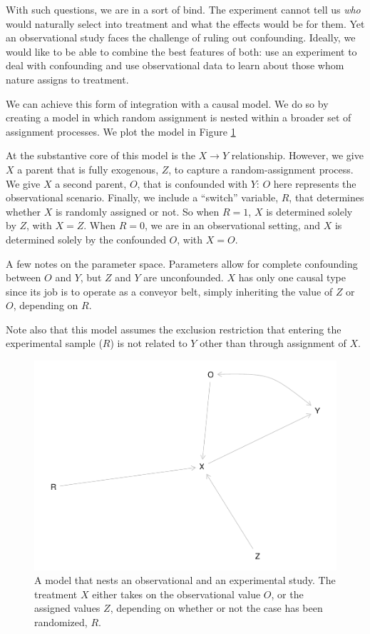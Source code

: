 \documentclass[
  12pt,
]{book}
\begin{document}
With such questions, we are in a sort of bind. The experiment cannot tell us \emph{who} would naturally select into treatment and what the effects would be for them. Yet an observational study faces the challenge of ruling out confounding. Ideally, we would like to be able to combine the best features of both: use an experiment to deal with confounding and use observational data to learn about those whom nature assigns to treatment.

We can achieve this form of integration with a causal model. We do so by creating a model in which random assignment is nested within a broader set of assignment processes. We plot the model in Figure \ref{fig:appcombexpob}

At the substantive core of this model is the \(X \rightarrow Y\) relationship. However, we give \(X\) a parent that is fully exogenous, \(Z\), to capture a random-assignment process. We give \(X\) a second parent, \(O\), that is confounded with \(Y\): \(O\) here represents the observational scenario. Finally, we include a ``switch'' variable, \(R\), that determines whether \(X\) is randomly assigned or not. So when \(R=1\), \(X\) is determined solely by \(Z\), with \(X=Z\). When \(R=0\), we are in an observational setting, and \(X\) is determined solely by the confounded \(O\), with \(X=O\).

A few notes on the parameter space. Parameters allow for complete confounding between \(O\) and \(Y\), but \(Z\) and \(Y\) are unconfounded. \(X\) has only one causal type since its job is to operate as a conveyor belt, simply inheriting the value of \(Z\) or \(O\), depending on \(R\).

Note also that this model assumes the exclusion restriction that entering the experimental sample (\(R\)) is not related to \(Y\) other than through assignment of \(X\).

\begin{figure}
\centering
\includegraphics{ii_files/figure-latex/appcombexpob-1.pdf}
\caption{\label{fig:appcombexpob}A model that nests an observational and an experimental study. The treatment \(X\) either takes on the observational value \(O\), or the assigned values \(Z\), depending on whether or not the case has been randomized, \(R\).}
\end{figure}
\end{document}
